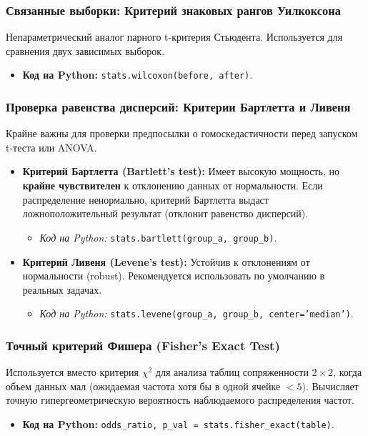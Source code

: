 \documentclass[12pt]{article}
\begin{document}
\subsubsection{Связанные выборки: Критерий знаковых рангов Уилкоксона}
Непараметрический аналог парного t-критерия Стьюдента. Используется для сравнения двух зависимых выборок.
\begin{itemize}
    \item \textbf{Код на Python:} \texttt{stats.wilcoxon(before, after)}.
\end{itemize}

\subsubsection{Проверка равенства дисперсий: Критерии Бартлетта и Ливеня}
Крайне важны для проверки предпосылки о гомоскедастичности перед запуском t-теста или ANOVA.
\begin{itemize}
    \item \textbf{Критерий Бартлетта (Bartlett's test):} Имеет высокую мощность, но \textbf{крайне чувствителен} к отклонению данных от нормальности. Если распределение ненормально, критерий Бартлетта выдаст ложноположительный результат (отклонит равенство дисперсий).
    \begin{itemize}
        \item \textit{Код на Python:} \texttt{stats.bartlett(group\_a, group\_b)}.
    \end{itemize}
    \item \textbf{Критерий Ливеня (Levene's test):} Устойчив к отклонениям от нормальности (robust). Рекомендуется использовать по умолчанию в реальных задачах.
    \begin{itemize}
        \item \textit{Код на Python:} \texttt{stats.levene(group\_a, group\_b, center='median')}.
    \end{itemize}
\end{itemize}

\subsubsection{Точный критерий Фишера (Fisher's Exact Test)}
Используется вместо критерия $\chi^2$ для анализа таблиц сопряженности $2 \times 2$, когда объем данных мал (ожидаемая частота хотя бы в одной ячейке $< 5$). Вычисляет точную гипергеометрическую вероятность наблюдаемого распределения частот.
\begin{itemize}
    \item \textbf{Код на Python:} \texttt{odds\_ratio, p\_val = stats.fisher\_exact(table)}.
\end{itemize}
\end{document}
